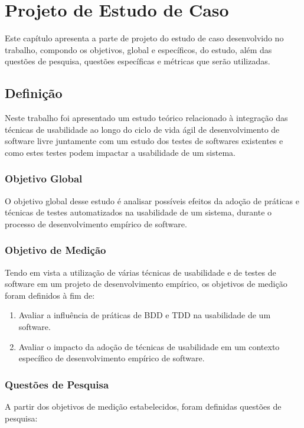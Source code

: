 \chapter{Projeto de Estudo de Caso}


Este capítulo apresenta a parte de projeto do estudo de caso desenvolvido no trabalho, compondo os objetivos, global e específicos, do estudo, além das questões de pesquisa, questões específicas e métricas que serão utilizadas.



\section{Definição}
Neste trabalho foi apresentado um estudo teórico relacionado à integração das técnicas de usabilidade ao longo do ciclo de vida ágil de desenvolvimento de software livre juntamente com um estudo dos testes de softwares existentes e como estes testes podem impactar a usabilidade de um sistema.


\subsection{Objetivo Global}

O objetivo global desse estudo é analisar possíveis efeitos da adoção de práticas e técnicas de testes automatizados na usabilidade de um sistema, durante o processo de desenvolvimento empírico de software.

\subsection{Objetivo de Medição}

Tendo em vista a utilização de várias técnicas de usabilidade e de testes de software em um projeto de desenvolvimento empírico, os objetivos de medição foram definidos à fim de:

\begin{enumerate}
\item Avaliar a influência de práticas de BDD e TDD na usabilidade de um software. 

\item Avaliar o impacto da adoção de técnicas de usabilidade em um contexto específico de desenvolvimento empírico de software.
\end{enumerate}

\subsection{Questões de Pesquisa}
A partir dos objetivos de medição estabelecidos, foram definidas questões de pesquisa:

